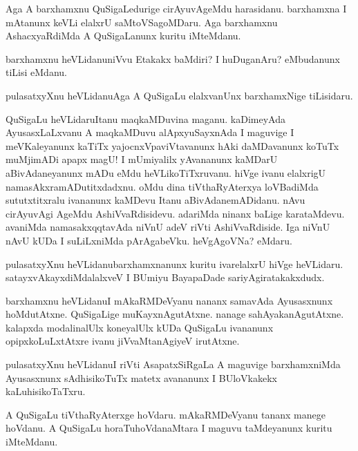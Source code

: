\begin{mng}
Aga A barxhamxnu QuSigaLedurige cirAyuvAgeMdu harasidanu. barxhamxna I mAtanunx keVLi elalxrU saMtoVSagoMDaru. Aga barxhamxnu AshacxyaRdiMda A QuSigaLanunx kuritu iMteMdanu.
\end{mng}

\begin{mng}
barxhamxnu heVLidanu\mdash niVvu Etakakx baMdiri? I huDuganAru? eMbudanunx tiLisi eMdanu.
\end{mng}

\begin{mng}
pulasatxyXnu heVLidanu\mdash Aga A QuSigaLu elalxvanUnx barxhamxNige tiLisidaru.
\end{mng}

\begin{mng}
QuSigaLu heVLidaru\mdash Itanu maqkaMDuvina maganu. kaDimeyAda AyusasxLaLxvanu A maqkaMDuvu alApxyuSayxnAda I maguvige I meVKaleyanunx kaTiTx yajocnxVpaviVtavanunx hAki daMDavanunx koTuTx muMjimADi apapx magU! I mUmiyalilx yAvananunx kaMDarU aBivAdaneyanunx mADu eMdu heVLikoTiTxruvanu. hiVge ivanu elalxrigU namasAkxramADutitxdadxnu. oMdu dina tiVthaRyAterxya loVBadiMda sututxtitxralu ivananunx kaMDevu Itanu aBivAdanemADidanu. nAvu cirAyuvAgi AgeMdu AshiVvaRdisidevu. adariMda ninanx baLige karataMdevu. avaniMda namasakxqqtavAda niVnU adeV riVti AshiVvaRdiside. Iga niVnU nAvU kUDa I suLiLxniMda pArAgabeVku. heVgAgoVNa? eMdaru.
\end{mng}

\begin{mng}
pulasatxyXnu heVLidanu\mdash barxhamxnanunx kuritu ivarelalxrU hiVge heVLidaru. satayxvAkayxdiMdalalxveV I BUmiyu BayapaDade sariyAgiratakakxdudx.
\end{mng}

\begin{mng}
barxhamxnu heVLidanu\mdash I mAkaRMDeVyanu nananx samavAda Ayusasxnunx hoMdutAtxne. QuSigaLige muKayxnAgutAtxne. nanage sahAyakanAgutAtxne. kalapxda modalinalUlx koneyalUlx kUDa QuSigaLu ivananunx opipxkoLuLxtAtxre ivanu jiVvaMtanAgiyeV irutAtxne.
\end{mng}

\begin{mng}
pulasatxyXnu heVLidanu\mdash I riVti AsapatxSiRgaLa A maguvige barxhamxniMda Ayusasxnunx sAdhisikoTuTx matetx avananunx I BUloVkakekx kaLuhisikoTaTxru.
\end{mng}

\begin{mng}
A QuSigaLu tiVthaRyAterxge hoVdaru. mAkaRMDeVyanu tananx manege hoVdanu. A QuSigaLu horaTuhoVdanaMtara I maguvu taMdeyanunx kuritu iMteMdanu.
\end{mng}

